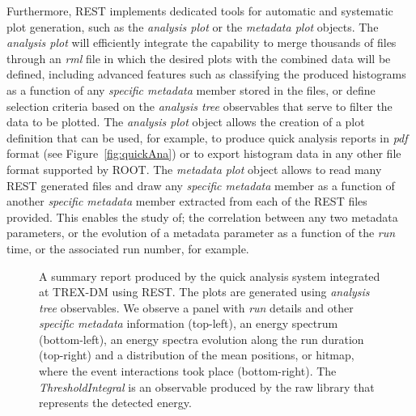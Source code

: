 Furthermore, REST implements dedicated tools for automatic and systematic plot generation, such as the \emph{analysis plot} or the \emph{metadata plot} objects. 
The \emph{analysis plot} will efficiently integrate the capability to merge thousands of files through an \emph{rml} file in which the desired plots with the combined data will be defined, including advanced features such as classifying the produced histograms as a function of any \emph{specific metadata} member stored in the files, or define selection criteria based on the \emph{analysis tree} observables that serve to filter the data to be plotted. The \emph{analysis plot} object allows the creation of a plot definition that can be used, for example, to produce quick analysis reports in \emph{pdf} format (see Figure~\ref{fig:quickAna}) or to export histogram data in any other file format supported by ROOT.
The \emph{metadata plot} object allows to read many REST generated files and draw any \emph{specific metadata} member as a function of another \emph{specific metadata} member extracted from each of the REST files provided. This enables the study of; the correlation between any two metadata parameters, or the evolution of a metadata parameter as a function of the \emph{run} time, or the associated run number, for example.

\begin{figure}[h]
  \centering
	\caption{A summary report produced by the quick analysis system integrated at TREX-DM using REST. The plots are generated using \emph{analysis tree} observables. We observe a panel with \emph{run} details and other \emph{specific metadata} information (top-left), an energy spectrum (bottom-left), an energy spectra evolution along the run duration (top-right) and a distribution of the mean positions, or hitmap, where the event interactions took place (bottom-right). The \emph{ThresholdIntegral} is an observable produced by the raw library that represents the detected energy.}
	\label{fig:executables}
\end{figure}

